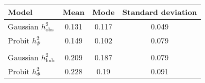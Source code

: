 \begin{tabular}{lccc}
 \hline
 Model & Mean & Mode & Standard deviation  \\ 
 \hline 

 Gaussian $h^2_\text{obs}$ & 0.131 & 0.117 & 0.049 \\ 
 Probit $h^2_{\Psi}$ & 0.149 & 0.102 & 0.079 \\ 
  & & & \\ 
 Gaussian $h^2_\text{liab}$ & 0.209 & 0.187 & 0.079 \\ 
 Probit $h^2_{\Phi}$ & 0.228 & 0.19 & 0.091 \\ 
 \bottomrule
\end{tabular}
